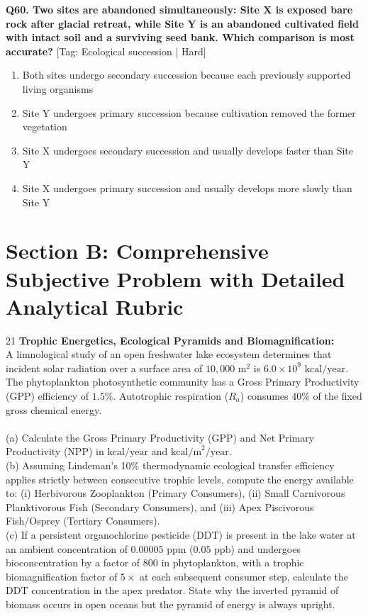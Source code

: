 \noindent\textbf{Q60. Two sites are abandoned simultaneously: Site X is exposed bare rock after glacial retreat, while Site Y is an abandoned cultivated field with intact soil and a surviving seed bank. Which comparison is most accurate?} \hfill [Tag: Ecological succession | Hard]
\begin{enumerate}[label=(\alph*),topsep=2pt,itemsep=1pt,partopsep=0pt,parsep=0pt]
    \item {Both sites undergo secondary succession because each previously supported living organisms}
    \item {Site Y undergoes primary succession because cultivation removed the former vegetation}
    \item {Site X undergoes secondary succession and usually develops faster than Site Y}
    \item {Site X undergoes primary succession and usually develops more slowly than Site Y}
\end{enumerate}
\vspace{2mm}


\section{Section B: Comprehensive Subjective Problem with Detailed Analytical Rubric}

\begin{subjectiveq}{2}{1}
\textbf{Trophic Energetics, Ecological Pyramids and Biomagnification:}\\A limnological study of an open freshwater lake ecosystem determines that incident solar radiation over a surface area of $10{,}000\text{ m}^2$ is $6.0 \times 10^9\text{ kcal/year}$. The phytoplankton photosynthetic community has a Gross Primary Productivity (GPP) efficiency of $1.5\%$. Autotrophic respiration ($R_a$) consumes $40\%$ of the fixed gross chemical energy.\\\\(a) Calculate the Gross Primary Productivity (GPP) and Net Primary Productivity (NPP) in $\text{kcal/year}$ and $\text{kcal/m}^2/\text{year}$.\\(b) Assuming Lindeman's 10\% thermodynamic ecological transfer efficiency applies strictly between consecutive trophic levels, compute the energy available to: (i) Herbivorous Zooplankton (Primary Consumers), (ii) Small Carnivorous Planktivorous Fish (Secondary Consumers), and (iii) Apex Piscivorous Fish/Osprey (Tertiary Consumers).\\(c) If a persistent organochlorine pesticide (DDT) is present in the lake water at an ambient concentration of $0.00005\text{ ppm}$ ($0.05\text{ ppb}$) and undergoes bioconcentration by a factor of $800$ in phytoplankton, with a trophic biomagnification factor of $5\times$ at each subsequent consumer step, calculate the DDT concentration in the apex predator. State why the inverted pyramid of biomass occurs in open oceans but the pyramid of energy is always upright.
\end{subjectiveq}

